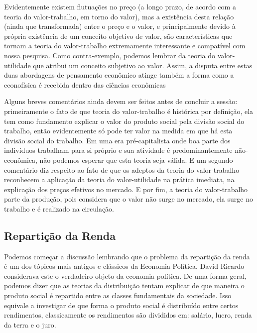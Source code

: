 Evidentemente existem flutuações no preço (a longo prazo, de acordo com a teoria do valor-trabalho, em torno do valor), mas a existência desta relação (ainda que transformada) entre o preço e o valor, e  principalmente  devido à própria existência de um conceito objetivo de valor, são características que tornam a teoria do valor-trabalho extremamente interessante e compatível com nossa pesquisa. Como contra-exemplo, podemos lembrar da teoria do valor-utilidade que atribui um conceito subjetivo ao valor. Assim, a disputa entre estas duas abordagens de pensamento econômico atinge também a forma como a econofísica é recebida dentro das ciências econômicas


Alguns breves comentários ainda devem ser feitos antes de concluir a sessão: primeiramente o fato de que teoria do valor-trabalho é histórica por definição, ela tem como fundamento explicar o valor do produto social pela divisão social do trabalho, então evidentemente só pode ter valor na medida em que há esta divisão social do trabalho. Em uma era pré-capitalista onde boa parte dos indivíduos trabalham para si próprio e sua atividade é predominantemente não-econômica, não podemos esperar que esta teoria seja válida. E um segundo comentário diz respeito ao fato de que os adeptos da teoria do valor-trabalho reconhecem a aplicação da teoria do valor-utilidade na prática imediata, na explicação dos preços efetivos no mercado. E por fim, a teoria do valor-trabalho parte da produção, pois considera que o valor não surge no mercado, ela surge no trabalho e é realizado na circulação.

\subsection{Repartição da Renda }    

Podemos começar a discussão lembrando que o problema da repartição da renda é um dos tópicos mais antigos e clássicos da Economia Política. David Ricardo considerava este o verdadeiro objeto da economia política. De uma forma geral, podemos dizer que as teorias da distribuição tentam explicar de que maneira o produto social é repartido entre as classes fundamentais da sociedade. Isso equivale a investigar de que forma o produto social é distribuído entre certos rendimentos, classicamente os rendimentos são divididos em: salário, lucro, renda da terra e o juro.

